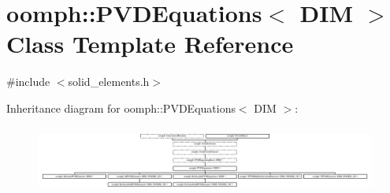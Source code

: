 \hypertarget{classoomph_1_1PVDEquations}{}\section{oomph\+:\+:P\+V\+D\+Equations$<$ D\+IM $>$ Class Template Reference}
\label{classoomph_1_1PVDEquations}


{\ttfamily \#include $<$solid\+\_\+elements.\+h$>$}

Inheritance diagram for oomph\+:\+:P\+V\+D\+Equations$<$ D\+IM $>$\+:\begin{figure}[H]
\begin{center}
\leavevmode
\includegraphics[height=2.214689cm]{classoomph_1_1PVDEquations}
\end{center}
\end{figure}
